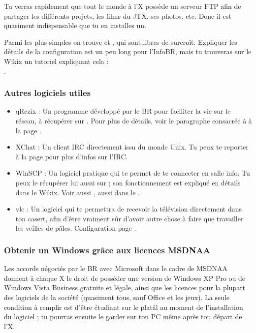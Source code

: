 Tu verras rapidement que tout le monde \`a l'X poss\`ede un serveur FTP
afin de partager les diff\'erents projets, les films du JTX, ses
photos, etc. Donc il est quasiment indispensable que tu en installes
un.

Parmi les plus simples on trouve  et , qui sont libres de surcro\^{i}t. Expliquer les d\'etails de la configuration est un peu long pour l'InfoBR, mais tu trouveras sur le Wikix un tutoriel expliquant cela : \\
.

\subsubsection{Autres logiciels utiles}

\begin{itemize}
  \item qRezix : Un programme d\'evelopp\'e par le BR pour faciliter la vie sur le r\'eseau,
                  \`a r\'ecup\'erer sur \xshare. Pour plus de d\'etails, voir le paragraphe consacr\'ee
                  \`a  \`a la page \pageref{qrezix}.
  \item XChat : Un client IRC directement issu du monde Unix.
                 Tu peux te reporter \`a la page \pageref{irc} pour plus d'infos sur l'IRC.
  \item WinSCP : Un logiciel pratique qui te permet de te connecter en salle info.
                  Tu peux le r\'ecup\'erer lui aussi sur \xshare ;
                  son fonctionnement est expliqu\'e en d\'etails dans le Wikix. Voir aussi , aussi dans le \xshare.
  \item vlc : Un logiciel qui te permettra de recevoir la t\'el\'evision directement dans ton casert, afin d'\^etre vraiment s\^{u}r d'avoir autre chose \`a faire que travailler les veilles de p\^ales. Configuration page \pageref{TV}.
\end{itemize}


\subsubsection{Obtenir un Windows gr\^{a}ce aux licences MSDNAA}

\label{msdnaa} Les accords n\'egoci\'es par le BR avec Microsoft dans le cadre de MSDNAA donnent \`a chaque X le droit de poss\'eder une version de Windows
XP Pro ou de Windows Vista Business gratuite et l\'egale, ainsi que les licences pour la plupart des logiciels de la soci\'et\'e (quasiment tous, sauf
Office et les jeux). La seule condition \`a remplir est d'\^etre \'etudiant sur le plat\^{a}l au moment de l'installation du logiciel ; tu pourras ensuite le
garder sur ton PC m\^eme apr\`es ton d\'epart de l'X.

